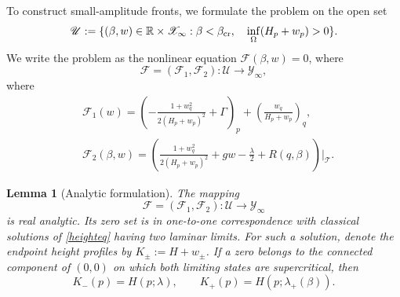 \documentclass[12pt,letterpaper]{amsart}
\newtheorem{lemma}[theorem]{Lemma}
\numberwithin{equation}{section}
\def\R{{\mathbb R}}
\begin{document}
	
	
	
	{To construct small-amplitude fronts, we formulate the problem on the open set}
	\begin{equation}\label{eq:U-open}
		\mathscr{U}:=\{(\beta,w)\in\R\times\mathscr X_\infty:\beta<\beta_{\rm cr},\quad \inf_\Omega(H_p+w_p)>0\}.
	\end{equation}
	{We write the problem as the nonlinear equation $\mathcal F(\beta,w)=0$, where}
	\begin{equation*}
		\mathcal{F}=(\mathcal{F}_1,\mathcal{F}_2):\mathscr{U}\to \mathscr Y_\infty,
	\end{equation*}
	where
	\begin{equation}\label{eq:nonlinear-operator}
		\begin{aligned}
	&\mathcal{F}_1(w)=\left( -\frac{1 + w_q^2}{2(H_{p} + w_p)^2} + \Gamma \right)_p + \left( \frac{w_q}{H_{p} + w_p} \right)_q,\\
	&\mathcal{F}_2(\beta,w)=\left( \frac{1 + w_q^2}{2(H_{p} + w_p)^2} + gw - \frac{\lambda}{2} + R(q, \beta) \right) \bigg|_\mathcal T.
		\end{aligned}
	\end{equation}
\begin{lemma}[Analytic formulation]\label{lemma:analytic-map}
	The mapping
	\[
	\mathcal F=(\mathcal F_1,\mathcal F_2):\mathscr U\longrightarrow\mathscr {Y}_\infty
	\]
	is real analytic.  Its zero set is in one-to-one correspondence with classical
	solutions of \eqref{heighteq} having two laminar limits. {For such a solution, denote the endpoint height profiles by $K_\pm:=H+w_\pm$.} If a zero belongs to the
	connected component of \((0,0)\) on which both limiting states are supercritical,
	then
	\begin{equation}\label{eq:endpoint-profiles}
		{K_-(p)}=H(p;\lambda),\qquad
		{K_+(p)}=H(p;\lambda_+(\beta)).
	\end{equation}
\end{lemma}
\end{document}
